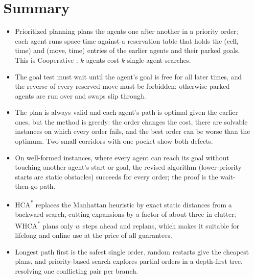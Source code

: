 \section{Summary}
\begin{summary}
\begin{itemize}
  \item Prioritized planning plans the agents one after another in a priority order;
        each agent runs space-time \astar against a reservation table that holds the
        (cell, time) and (move, time) entries of the earlier agents and their parked
        goals. This is Cooperative \astar; $k$ agents cost $k$ single-agent searches.
  \item The goal test must wait until the agent's goal is free for all later times,
        and the reverse of every reserved move must be forbidden; otherwise parked
        agents are run over and swaps slip through.
  \item The plan is always valid and each agent's path is optimal given the earlier
        ones, but the method is greedy: the order changes the cost, there are solvable
        instances on which every order fails, and the best order can be worse than the
        optimum. Two small corridors with one pocket show both defects.
  \item On well-formed instances, where every agent can reach its goal without
        touching another agent's start or goal, the revised algorithm (lower-priority
        starts are static obstacles) succeeds for every order; the proof is the
        wait-then-go path.
  \item HCA\textsuperscript{*} replaces the Manhattan heuristic by exact static
        distances from a backward search, cutting expansions by a factor of about three
        in clutter; WHCA\textsuperscript{*} plans only $w$ steps ahead and replans,
        which makes it suitable for lifelong and online use at the price of all
        guarantees.
  \item Longest path first is the safest single order, random restarts give the
        cheapest plans, and priority-based search explores partial orders in a
        depth-first tree, resolving one conflicting pair per branch.
\end{itemize}
\end{summary}

